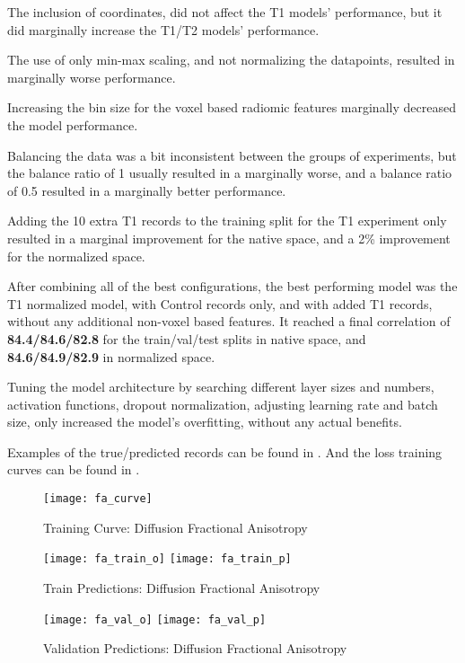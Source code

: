 The inclusion of coordinates, did not affect the T1 models' performance, but it did marginally increase the T1/T2 models' performance.\par
The use of only min-max scaling, and not normalizing the datapoints, resulted in marginally worse performance.\par
Increasing the bin size for the voxel based radiomic features marginally decreased the model performance.\par
Balancing the data was a bit inconsistent between the groups of experiments, but the balance ratio of 1 usually resulted in a marginally worse, and a balance ratio of 0.5 resulted in a marginally better performance.\par
Adding the 10 extra T1 records to the training split for the T1 experiment only resulted in a marginal improvement for the native space, and a 2\% improvement for the normalized space.\par
After combining all of the best configurations, the best performing model was the T1 normalized model, with Control records only, and with added T1 records, without any additional non-voxel based features. It reached a final correlation of \textbf{84.4/84.6/82.8} for the train/val/test splits in native space, and \textbf{84.6/84.9/82.9} in normalized space.\par
Tuning the model architecture by searching different layer sizes and numbers, activation functions, dropout normalization, adjusting learning rate and batch size, only increased the model’s overfitting, without any actual benefits.\par
Examples of the true/predicted records can be found in  . And the loss training curves can be found in .

\begin{figure}[H]
\centering
\texttt{[image: fa\_curve]}
\caption{Training Curve: Diffusion Fractional Anisotropy}
\label{fig:curve-fa}
\end{figure}

\begin{figure}[H]
\centering
\texttt{[image: fa\_train\_o]}
\texttt{[image: fa\_train\_p]}
\caption{Train Predictions: Diffusion Fractional Anisotropy}
\label{fig:pred-tra-fa}
\end{figure}

\begin{figure}[H]
\centering
\texttt{[image: fa\_val\_o]}
\texttt{[image: fa\_val\_p]}
\caption{Validation Predictions: Diffusion Fractional Anisotropy}
\label{fig:pred-val-fa}
\end{figure}


